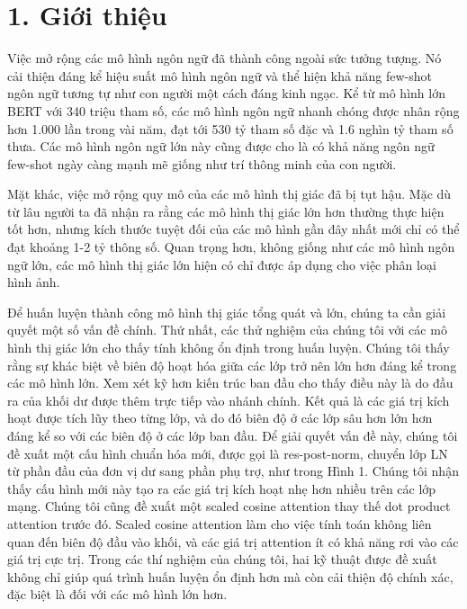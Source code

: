 \documentclass[times, twoside]{zHenriquesLab-StyleBioRxiv}
\begin{document}



\section*{1. Giới thiệu}
Việc mở rộng các mô hình ngôn ngữ đã thành công ngoài sức tưởng tượng. Nó cải thiện đáng kể hiệu suất mô hình ngôn ngữ và thể hiện khả năng few-shot ngôn ngữ tương tự như con người một cách đáng kinh ngạc. Kể từ mô hình lớn BERT với 340 triệu tham số, các mô hình ngôn ngữ nhanh chóng được nhân rộng hơn 1.000 lần trong vài năm, đạt tới 530 tỷ tham số đặc và 1.6 nghìn tỷ tham số thưa. Các mô hình ngôn ngữ lớn này cũng được cho là có khả năng ngôn ngữ few-shot ngày càng mạnh mẽ giống như trí thông minh của con người.

Mặt khác, việc mở rộng quy mô của các mô hình thị giác đã bị tụt hậu. Mặc dù từ lâu người ta đã nhận ra rằng các mô hình thị giác lớn hơn thường thực hiện tốt hơn, nhưng kích thước tuyệt đối của các mô hình gần đây nhất mới chỉ có thể đạt khoảng 1-2 tỷ thông số. Quan trọng hơn, không giống như các mô hình ngôn ngữ lớn, các mô hình thị giác lớn hiện có chỉ được áp dụng cho việc phân loại hình ảnh.

Để huấn luyện thành công mô hình thị giác tổng quát và lớn, chúng ta cần giải quyết một số vấn đề chính. Thứ nhất, các thử nghiệm của chúng tôi với các mô hình thị giác lớn cho thấy tính không ổn định trong huấn luyện. Chúng tôi thấy rằng sự khác biệt về biên độ hoạt hóa giữa các lớp trở nên lớn hơn đáng kể trong các mô hình lớn. Xem xét kỹ hơn kiến trúc ban đầu cho thấy điều này là do đầu ra của khối dư được thêm trực tiếp vào nhánh chính. Kết quả là các giá trị kích hoạt được tích lũy theo từng lớp, và do đó biên độ ở các lớp sâu hơn lớn hơn đáng kể so với các biên độ ở các lớp ban đầu. Để giải quyết vấn đề này, chúng tôi đề xuất một cấu hình chuẩn hóa mới, được gọi là res-post-norm, chuyển lớp LN từ phần đầu của đơn vị dư sang phần phụ trợ, như trong Hình 1. Chúng tôi nhận thấy cấu hình mới này tạo ra các giá trị kích hoạt nhẹ hơn nhiều trên các lớp mạng. Chúng tôi cũng đề xuất một scaled cosine attention thay thế dot product attention trước đó. Scaled cosine attention làm cho việc tính toán không liên quan đến biên độ đầu vào khối, và các giá trị attention ít có khả năng rơi vào các giá trị cực trị. Trong các thí nghiệm của chúng tôi, hai kỹ thuật được đề xuất không chỉ giúp quá trình huấn luyện ổn định hơn mà còn cải thiện độ chính xác, đặc biệt là đối với các mô hình lớn hơn.
\end{document}
